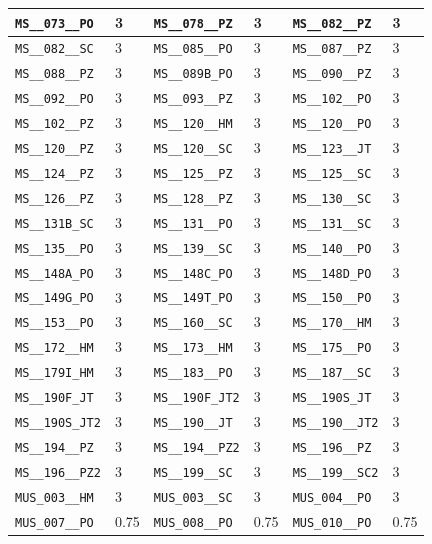 \begin{longtable}{|l|l||l|l||l|l|}
    \verb|MS__073__PO| & 3 & \verb|MS__078__PZ| & 3 & \verb|MS__082__PZ| & 3\\\hline
    \verb|MS__082__SC| & 3 & \verb|MS__085__PO| & 3 & \verb|MS__087__PZ| & 3\\\hline
    \verb|MS__088__PZ| & 3 & \verb|MS__089B_PO| & 3 & \verb|MS__090__PZ| & 3\\\hline
    \verb|MS__092__PO| & 3 & \verb|MS__093__PZ| & 3 & \verb|MS__102__PO| & 3\\\hline
    \verb|MS__102__PZ| & 3 & \verb|MS__120__HM| & 3 & \verb|MS__120__PO| & 3\\\hline
    \verb|MS__120__PZ| & 3 & \verb|MS__120__SC| & 3 & \verb|MS__123__JT| & 3\\\hline
    \verb|MS__124__PZ| & 3 & \verb|MS__125__PZ| & 3 & \verb|MS__125__SC| & 3\\\hline
    \verb|MS__126__PZ| & 3 & \verb|MS__128__PZ| & 3 & \verb|MS__130__SC| & 3\\\hline
    \verb|MS__131B_SC| & 3 & \verb|MS__131__PO| & 3 & \verb|MS__131__SC| & 3\\\hline
    \verb|MS__135__PO| & 3 & \verb|MS__139__SC| & 3 & \verb|MS__140__PO| & 3\\\hline
    \verb|MS__148A_PO| & 3 & \verb|MS__148C_PO| & 3 & \verb|MS__148D_PO| & 3\\\hline
    \verb|MS__149G_PO| & 3 & \verb|MS__149T_PO| & 3 & \verb|MS__150__PO| & 3\\\hline
    \verb|MS__153__PO| & 3 & \verb|MS__160__SC| & 3 & \verb|MS__170__HM| & 3\\\hline
    \verb|MS__172__HM| & 3 & \verb|MS__173__HM| & 3 & \verb|MS__175__PO| & 3\\\hline
    \verb|MS__179I_HM| & 3 & \verb|MS__183__PO| & 3 & \verb|MS__187__SC| & 3\\\hline
    \verb|MS__190F_JT| & 3 & \verb|MS__190F_JT2| & 3 & \verb|MS__190S_JT| & 3\\\hline
    \verb|MS__190S_JT2| & 3 & \verb|MS__190__JT| & 3 & \verb|MS__190__JT2| & 3\\\hline
    \verb|MS__194__PZ| & 3 & \verb|MS__194__PZ2| & 3 & \verb|MS__196__PZ| & 3\\\hline
    \verb|MS__196__PZ2| & 3 & \verb|MS__199__SC| & 3 & \verb|MS__199__SC2| & 3\\\hline
    \verb|MUS_003__HM| & 3 & \verb|MUS_003__SC| & 3 & \verb|MUS_004__PO| & 3\\\hline
    \verb|MUS_007__PO| & 0.75 & \verb|MUS_008__PO| & 0.75 & \verb|MUS_010__PO| & 0.75\\\hline

\end{longtable}
